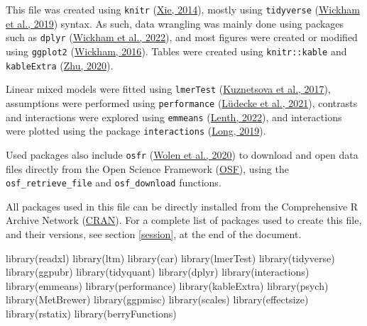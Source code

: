 \documentclass[
  bookmarksnumbered]{article}
\newenvironment{Shaded}{\begin{snugshade}}{\end{snugshade}}
\newcommand{\FunctionTok}[1]{\textcolor[rgb]{0.94,0.94,0.56}{#1}}
\newcommand{\NormalTok}[1]{\textcolor[rgb]{0.80,0.80,0.80}{#1}}
\begin{document}
This file was created using \texttt{knitr} (\protect\hyperlink{ref-knitrcit}{Xie, 2014}), mostly using \texttt{tidyverse} (\protect\hyperlink{ref-tidyversecit}{Wickham et al., 2019}) syntax. As such, data wrangling was mainly done using packages such as \texttt{dplyr} (\protect\hyperlink{ref-dplyrcit}{Wickham et al., 2022}), and most figures were created or modified using \texttt{ggplot2} (\protect\hyperlink{ref-ggplotcit}{Wickham, 2016}). Tables were created using \texttt{knitr::kable} and \texttt{kableExtra} (\protect\hyperlink{ref-kableExtracit}{Zhu, 2020}).

Linear mixed models were fitted using \texttt{lmerTest} (\protect\hyperlink{ref-lmertestcit}{Kuznetsova et al., 2017}), assumptions were performed using \texttt{performance} (\protect\hyperlink{ref-ludecke2021}{Lüdecke et al., 2021}), contrasts and interactions were explored using \texttt{emmeans} (\protect\hyperlink{ref-emmeanscit}{Lenth, 2022}), and interactions were plotted using the package \texttt{interactions} (\protect\hyperlink{ref-interactionscit}{Long, 2019}).

Used packages also include \texttt{osfr} (\protect\hyperlink{ref-osfrcit}{Wolen et al., 2020}) to download and open data files directly from the Open Science Framework (\href{https://osf.io/}{OSF}), using the \texttt{osf\_retrieve\_file} and \texttt{osf\_download} functions.

All packages used in this file can be directly installed from the Comprehensive R Archive Network (\href{https://cran.r-project.org/}{CRAN}). For a complete list of packages used to create this file, and their versions, see section \ref{session}, at the end of the document.

\begin{Shaded}
\begin{Highlighting}[]
\FunctionTok{library}\NormalTok{(readxl)}
\FunctionTok{library}\NormalTok{(ltm)}
\FunctionTok{library}\NormalTok{(car)}
\FunctionTok{library}\NormalTok{(lmerTest)}
\FunctionTok{library}\NormalTok{(tidyverse)}
\FunctionTok{library}\NormalTok{(ggpubr)}
\FunctionTok{library}\NormalTok{(tidyquant)}
\FunctionTok{library}\NormalTok{(dplyr)}
\FunctionTok{library}\NormalTok{(interactions)}
\FunctionTok{library}\NormalTok{(emmeans)}
\FunctionTok{library}\NormalTok{(performance)}
\FunctionTok{library}\NormalTok{(kableExtra)}
\FunctionTok{library}\NormalTok{(psych)}
\FunctionTok{library}\NormalTok{(MetBrewer)}
\FunctionTok{library}\NormalTok{(ggpmisc)}
\FunctionTok{library}\NormalTok{(scales)}
\FunctionTok{library}\NormalTok{(effectsize)}
\FunctionTok{library}\NormalTok{(rstatix)}
\FunctionTok{library}\NormalTok{(berryFunctions)}
\end{Highlighting}
\end{Shaded}
\end{document}
